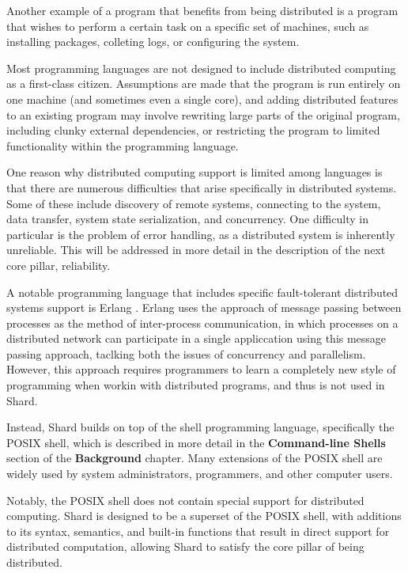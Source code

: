 \documentclass[twoside]{report}
\begin{document}
Another example of a program that benefits from being distributed is a program that wishes to perform a certain task on a specific set of machines, such as installing packages, colleting logs, or configuring the system.

Most programming languages are not designed to include distributed computing as a first-class citizen.
Assumptions are made that the program is run entirely on one machine (and sometimes even a single core), and adding distributed features to an existing program may involve rewriting large parts of the original program, including clunky external dependencies, or restricting the program to limited functionality within the programming language.

One reason why distributed computing support is limited among languages is that there are numerous difficulties that arise specifically in distributed systems. Some of these include discovery of remote systems, connecting to the system, data transfer, system state serialization, and concurrency.
One difficulty in particular is the problem of error handling, as a distributed system is inherently unreliable. This will be addressed in more detail in the description of the next core pillar, reliability.

A notable programming language that includes specific fault-tolerant distributed systems support is Erlang \cite{armstrong2010erlang}. Erlang uses the approach of message passing between processes as the method of inter-process communication, in which processes on a distributed network can participate in a single appliccation using this message passing approach, taclking both the issues of concurrency and parallelism.
However, this approach requires programmers to learn a completely new style of programming when workin with distributed programs, and thus is not used in Shard.

Instead, Shard builds on top of the shell programming language, specifically the POSIX shell, which is described in more detail in the \textbf{Command-line Shells} section of the \textbf{Background} chapter. Many extensions of the POSIX shell are widely used by system administrators, programmers, and other computer users.

Notably, the POSIX shell does not contain special support for distributed computing. Shard is designed to be a superset of the POSIX shell, with additions to its syntax, semantics, and built-in functions that result in direct support for distributed computation, allowing Shard to satisfy the core pillar of being distributed.
\end{document}
